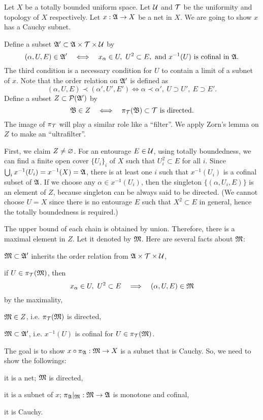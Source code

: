 \documentclass{../exp}
\begin{document}
\begin{pf}[1 of Theorem 1.1]
Let $X$ be a totally bounded uniform space.
Let $\mathcal{U}$ and $\mathcal{T}$ be the uniformity and topology of $X$ respectively.
Let $x:\fA\to X$ be a net in $X$.
We are going to show $x$ has a Cauchy subnet.


Define a subset $\mathfrak{A}'\subset\mathfrak{A}\times\mathcal{T}\times\mathcal{U}$ by
\[(\alpha,U,E)\in\fA'\iff x_\alpha\in U,\ U^2\subset E,\text{ and }x^{-1}(U)\text{ is cofinal in }\fA.\]
The third condition is a necessary condition for $U$ to contain a limit of a subnet of $x$.
Note that the order relation on $\mathfrak{A}'$ is defined as
\[(\alpha,U,E)\prec(\alpha',U',E')\iff \alpha\prec\alpha',\ U\supset U',\ E\supset E'.\]
Define a subset $Z\subset\mathcal{P}(\mathfrak{A}')$ by
\[\fB\in Z\iff \pi_\cT(\fB)\subset\cT\text{ is directed}.\]
The image of $\pi_{\mathcal{T}}$ will play a similar role like a ``filter''.
We apply Zorn's lemma on $Z$ to make an ``ultrafilter''.

First, we claim $Z\ne\varnothing$.
For an entourage $E\in\mathcal{U}$, using totally boundedness, we can find a finite open cover $\{U_i\}_i$ of $X$ such that $U_i^2\subset E$ for all $i$.
Since $\bigcup_ix^{-1}(U_i)=x^{-1}(X)=\mathfrak{A}$, there is at least one $i$ such that $x^{-1}(U_i)$ is a cofinal subset of $\mathfrak{A}$.
If we choose any $\alpha\in x^{-1}(U_i)$, then the singleton $\{(\alpha,U_i,E)\}$ is an element of $Z$, because singleton can be always said to be directed.
(We cannot choose $U=X$ since there is no entourage $E$ such that $X^2\subset E$ in general, hence the totally boundedness is required.)

The upper bound of each chain is obtained by union.
Therefore, there is a maximal element in $Z$.
Let it denoted by $\mathfrak{M}$.
Here are several facts about $\mathfrak{M}$:
\begin{cond}
\item $\mathfrak{M}\subset\mathfrak{A}'$ inherits the order relation from $\mathfrak{A}\times\mathcal{T}\times\mathcal{U}$,
\item if $U\in\pi_{\mathcal{T}}(\mathfrak{M})$, then \[x_\alpha\in U,\ U^2\subset E\impl(\alpha,U,E)\in\fM\] by the maximality,
\item $\mathfrak{M}\in Z$, i.e. $\pi_{\mathcal{T}}(\mathfrak{M})$ is directed,
\item $\mathfrak{M}\subset\mathfrak{A}'$, i.e. $x^{-1}(U)$ is cofinal for $U\in\pi_{\mathcal{T}}(\mathfrak{M})$.
\end{cond}


The goal is to show $x\o\pi_\fA:\fM\to X$ is a subnet that is Cauchy.
So, we need to show the followings:
\begin{cond}
\item it is a net; $\mathfrak{M}$ is directed,
\item it is a subnet of $x$; $\pi_\fA|_\fM:\fM\to\fA$ is monotone and cofinal,
\item it is Cauchy.
\end{cond}


\end{pf}
\end{document}
